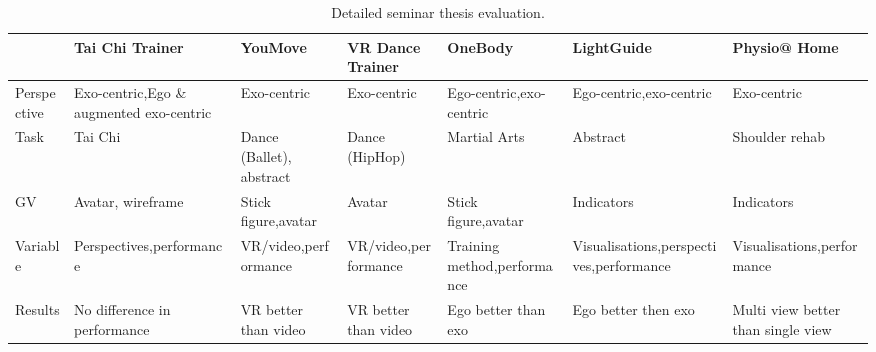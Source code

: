 \begin{table}[]
	\begin{tabularx}{\textwidth}{@{}X|XXXXXX@{}}
			\toprule
			& Tai Chi Trainer \cite{thaichichua}   & YouMove \cite{YouMove} & VR Dance Trainer \cite{vrdancetrainer} & OneBody \cite{onebody} & LightGuide \cite{lightguide} & Physio@ Home \cite{physioathome} \\ \midrule
			Perspective &
			Exo-centric,\newline Ego \& augmented exo-centric &
			Exo-centric &
			Exo-centric &
			Ego-centric,\newline exo-centric &
			Ego-centric,\newline exo-centric &
			Exo-centric \\ 
			Task & Tai Chi & Dance (Ballet), abstract & Dance (HipHop)   & Martial Arts         & Abstract   & Shoulder rehab \\ 
			GV   & Avatar, \newline wireframe & Stick figure,\newline avatar     & Avatar           & Stick figure,\newline avatar & Indicators & Indicators     \\ 
			Variable &
			Perspectives,\newline performance &
			VR/video,\newline performance &
			VR/video,\newline performance &
			Training method,\newline performance &
			Visualisations,\newline perspectives,\newline performance &
			Visualisations,\newline performance \\ 
			Results &
			No \newline difference in performance &
			VR better than video &
			VR better than video &
			Ego better than exo &
			Ego better then exo &
			Multi view better than single view \\ 
			\bottomrule
	\end{tabularx}
	\caption[Detailed analysis of related work in seminar thesis.]{Detailed seminar thesis evaluation.}
	\label{tab:rw_overview_detail}
\end{table}

